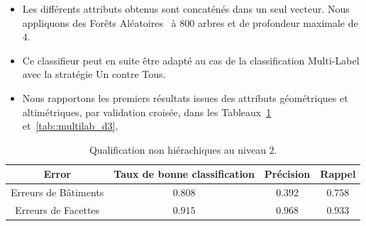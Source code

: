 \documentclass[a4paper,french]{article}
\begin{document}
    \begin{itemize}
        \item Les différents attributs obtenus sont concaténés dans un seul vecteur. Nous appliquons des Forêts Aléatoires~\cite{breiman2001random} à $800$ arbres et de profondeur maximale de $4$.
        \item Ce classifieur peut en suite être adapté au cas de la classification Multi-Label avec la stratégie Un contre Tous.
        \item Nous rapportons les premiers résultats issues des attributs géométriques et altimétriques, par validation croisée, dans les Tableaux~\ref{tab::multilab_d2} et~\ref{tab::multilab_d3}.
    \end{itemize}
    \begin{table}[H]
        \begin{center}
            \caption{\label{tab::multilab_d2}Qualification non hiérachiques au niveau $2$.}
            \begin{tabular}{c c c c}
                \toprule
                {\bf Error} & {\bf Taux de bonne classification} & {\bf Précision} & {\bf Rappel} \\
                \midrule
                Erreurs de Bâtiments & $0.808$ & $0.392$ & $0.758$ \\
                \midrule
                Erreurs de Facettes & $0.915$ & $0.968$ & $0.933$ \\
                \bottomrule
            \end{tabular}
        \end{center}
    \end{table}
\end{document}
